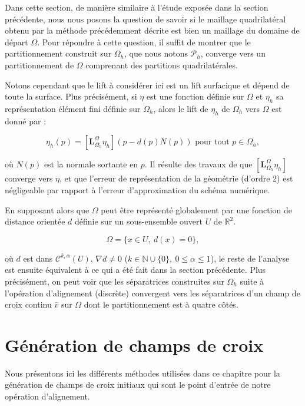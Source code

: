 Dans cette section, de manière similaire à l'étude exposée dans la section précédente, nous nous posons la question de savoir si le maillage quadrilatéral obtenu par la méthode précédemment décrite est bien un maillage du domaine de départ $\Omega$. Pour répondre à cette question, il suffit de montrer que le partitionnement construit sur $\Omega_h$, que nous notons $\mathcal{P}_h$, converge vers un partitionnement de $\Omega$ comprenant des partitions quadrilatérales.

Notons cependant que le lift à considérer ici est un lift surfacique et dépend de toute la surface. Plus précisément, si $\eta$ est une fonction définie sur $\Omega$ et $\eta_h$ sa représentation élément fini définie sur $\Omega_h$, alors le lift de $\eta_h$ de $\Omega_h$ vers $\Omega$ est donné par :

\begin{equation}
\eta_h(p)=[\mathbf{L}_{\Omega_h}^{\Omega}\eta_h](p-d(p)N(p))\text{ pour tout }p\in\Omega_h,
\end{equation}

où $N(p)$ est la normale sortante en $p$. Il résulte des travaux de \cite{dziuk1988finite} que $[\mathbf{L}_{\Omega_h}^{\Omega}\eta_h]$ converge vers $\eta$, et que l'erreur de représentation de la géométrie (d'ordre 2) est négligeable par rapport à l'erreur d'approximation du schéma numérique.

En supposant alors que $\Omega$ peut être représenté globalement par une fonction de distance orientée $d$ définie sur un sous-ensemble ouvert $U$ de $\mathbb{R}^2$.

\[
\Omega=\{x\in U,~d(x)=0\},
\]

où $d$ est dans $\mathcal{C}^{k,\alpha}(U)$, $\nabla d\neq 0$ ($k\in\mathbb{N}\cup\{0\},~0\leq\alpha\leq 1$), le reste de l'analyse est ensuite équivalent à ce qui a été fait dans la section précédente. Plus précisément, on peut voir que les séparatrices construites sur $\Omega_h$ suite à l'opération d'alignement (discrète) convergent vers les séparatrices d'un champ de croix continu $\bar{v}$ sur $\Omega$ dont le partitionnement est à quatre côtés.


\section{Génération de champs de croix}


Nous présentons ici les différents méthodes utilisées dans ce chapitre pour la génération de champs de croix  initiaux qui sont le point d'entrée de notre opération d'alignement.


